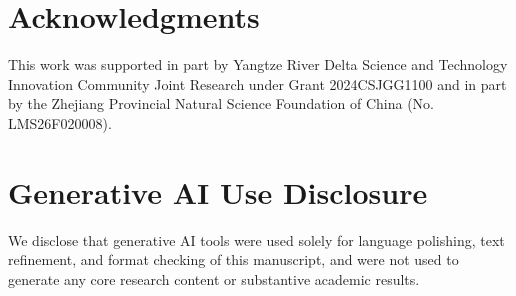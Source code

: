 \documentclass[cameraready]{Interspeech}
\begin{document}
\newpage

\section{Acknowledgments}
This work was supported in part by Yangtze River Delta Science and Technology Innovation Community Joint Research under Grant 2024CSJGG1100 and in part by the Zhejiang Provincial Natural Science Foundation of China (No. LMS26F020008).

\section{Generative AI Use Disclosure}
We disclose that generative AI tools were used solely for language polishing, text refinement, and format checking of this manuscript, and were not used to generate any core research content or substantive academic results. 



\end{document}
